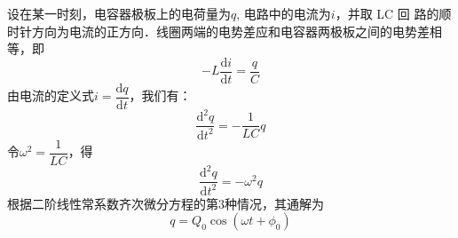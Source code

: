 设在某一时刻，电容器极板上的电荷量为$q$, 电路中的电流为$i$，并取 LC 回
路的顺时针方向为电流的正方向．线圈两端的电势差应和电容器两极板之间的电势差相等，即
\begin{equation}
-L \frac{\mathrm{d} i}{\mathrm{d} t}=\frac{q}{C}
\end{equation}
由电流的定义式$i=\dfrac{\mathrm{d} q}{\mathrm{d} t}$，我们有：
\begin{equation}
\frac{\mathrm{d}^{2} q}{\mathrm{d} t^{2}}=-\frac{1}{L C} q
\end{equation}
令$\omega^{2}=\dfrac{1}{L C}$，得
\begin{equation}
\frac{\mathrm{d}^{2} q}{\mathrm{d} t^{2}}=-\omega^{2} q
\end{equation}
根据二阶线性常系数齐次微分方程的第3种情况，其通解为
\begin{equation}
q=Q_{0} \cos \left(\omega t+\phi_{0}\right)
\end{equation}
 
